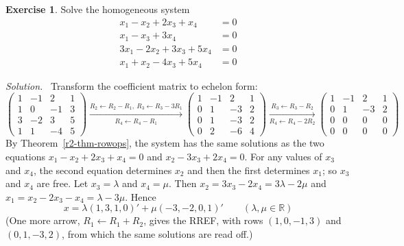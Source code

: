 \documentclass[12pt]{article}
\newcommand{\R}{\mathbb R}
\theoremstyle{definition}
\newtheorem{exercise}{Exercise}
\newenvironment{solution}{\par\noindent\textit{Solution.}\ }{\par\smallskip}
\begin{document}
\begin{exercise}\label{r2-ex-homogeneous-four}
Solve the homogeneous system
\[
\begin{aligned}
x_1-x_2+2x_3+x_4&=0\\
x_1-x_3+3x_4&=0\\
3x_1-2x_2+3x_3+5x_4&=0\\
x_1+x_2-4x_3+5x_4&=0
\end{aligned}
\]
\end{exercise}
\begin{solution}
Transform the coefficient matrix to echelon form:
\[
\begin{pmatrix}1&-1&2&1\\1&0&-1&3\\3&-2&3&5\\1&1&-4&5\end{pmatrix}
\xrightarrow[R_4\leftarrow R_4-R_1]{R_2\leftarrow R_2-R_1,\ R_3\leftarrow R_3-3R_1}
\begin{pmatrix}1&-1&2&1\\0&1&-3&2\\0&1&-3&2\\0&2&-6&4\end{pmatrix}
\xrightarrow[R_4\leftarrow R_4-2R_2]{R_3\leftarrow R_3-R_2}
\begin{pmatrix}1&-1&2&1\\0&1&-3&2\\0&0&0&0\\0&0&0&0\end{pmatrix}
\]
By Theorem~\ref{r2-thm-rowops}, the system has the same solutions as the two equations
\(x_1-x_2+2x_3+x_4=0\) and \(x_2-3x_3+2x_4=0\). For any values of \(x_3\) and \(x_4\), the
second equation determines \(x_2\) and then the first determines \(x_1\); so \(x_3\) and \(x_4\)
are free. Let \(x_3=\lambda\) and \(x_4=\mu\). Then \(x_2=3x_3-2x_4=3\lambda-2\mu\) and
\(x_1=x_2-2x_3-x_4=\lambda-3\mu\). Hence
\[
x=\lambda(1,3,1,0)'+\mu(-3,-2,0,1)'\qquad(\lambda,\mu\in\R)
\]
(One more arrow, \(R_1\leftarrow R_1+R_2\), gives the RREF, with rows \((1,0,-1,3)\) and
\((0,1,-3,2)\), from which the same solutions are read off.)
\end{solution}
\end{document}
